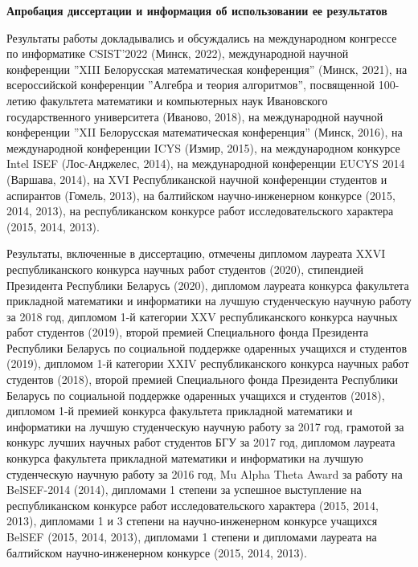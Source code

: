 \documentclass[_00_dissertation.tex]{subfiles}
\begin{document}
\begin{center}
\textbf{Апробация диссертации и информация об использовании ее результатов}
\end{center}

Результаты работы докладывались и обсуждались на международном конгрессе по информатике CSIST'2022 (Минск, 2022), международной научной конференции ''XIII Белорусская математическая конференция'' (Минск, 2021), на всероссийской конференции ''Алгебра и теория алгоритмов'', посвященной 100-летию факультета математики и компьютерных наук Ивановского государственного университета (Иваново, 2018), на международной научной конференции ''XII Белорусская математическая конференция'' (Минск, 2016), на международной конференции ICYS (Измир, 2015), на международном конкурсе Intel ISEF (Лос-Анджелес, 2014), на международной конференции EUCYS 2014 (Варшава, 2014), на XVI Республиканской научной конференции студентов и аспирантов (Гомель, 2013), на балтийском научно-инженерном конкурсе (2015, 2014, 2013), на республиканском конкурсе работ исследовательского характера (2015, 2014, 2013).

Результаты, включенные в диссертацию, отмечены дипломом лауреата XXVI республиканского конкурса научных работ студентов (2020), стипендией Президента Республики Беларусь (2020), дипломом лауреата конкурса факультета прикладной математики и информатики на лучшую студенческую научную работу за 2018 год, дипломом 1-й категории XXV республиканского конкурса научных работ студентов (2019), второй премией Специального фонда Президента Республики Беларусь по социальной поддержке одаренных учащихся и студентов (2019), дипломом 1-й категории XXIV республиканского конкурса научных работ студентов (2018), второй премией Специального фонда Президента Республики Беларусь по социальной поддержке одаренных учащихся и студентов (2018), дипломом 1-й премией конкурса факультета прикладной математики и информатики на лучшую студенческую научную работу за 2017 год, грамотой за конкурс лучших научных работ студентов БГУ за 2017 год, дипломом лауреата конкурса факультета прикладной математики и информатики на лучшую студенческую научную работу за 2016 год, Mu Alpha Theta Award за работу на BelSEF-2014 (2014), дипломами 1 степени за успешное выступление на республиканском конкурсе работ исследовательского характера (2015, 2014, 2013), дипломами 1 и 3 степени на научно-инженерном конкурсе учащихся BelSEF (2015, 2014, 2013), дипломами 1 степени и дипломами лауреата на балтийском научно-инженерном конкурсе (2015, 2014, 2013).
\end{document}
